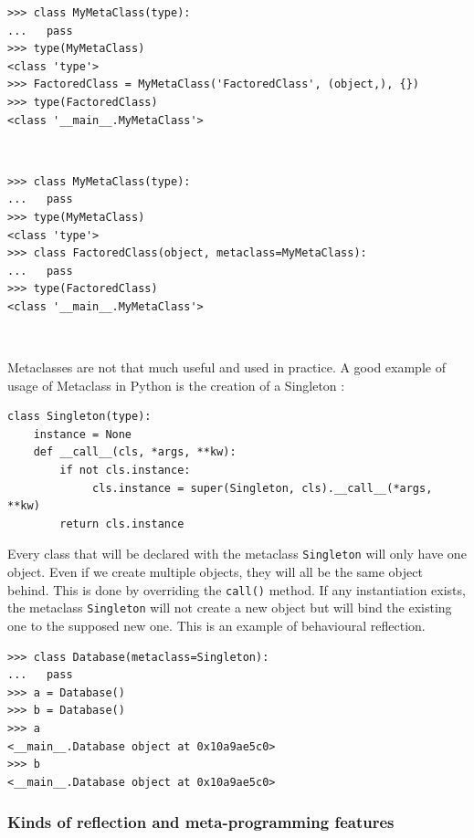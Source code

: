 \documentclass[a4paper,10pt]{article}
\begin{document}
\begin{minipage}[c]{.5\linewidth}
\begin{lstlisting}[caption=Without syntactic sugar]
>>> class MyMetaClass(type):
...   pass
>>> type(MyMetaClass)
<class 'type'>
>>> FactoredClass = MyMetaClass('FactoredClass', (object,), {})
>>> type(FactoredClass)
<class '__main__.MyMetaClass'>
\end{lstlisting}
~\\
\end{minipage} \hfill
\begin{minipage}[c]{.5\linewidth}
\begin{lstlisting}[caption=With syntactic sugar]
>>> class MyMetaClass(type):
...   pass
>>> type(MyMetaClass)
<class 'type'>
>>> class FactoredClass(object, metaclass=MyMetaClass):
...   pass
>>> type(FactoredClass)
<class '__main__.MyMetaClass'>
\end{lstlisting}
~\\
\end{minipage}

Metaclasses are not that much useful and used in practice.
A good example of usage of Metaclass in Python is the creation of a Singleton :

\begin{lstlisting}
class Singleton(type):
    instance = None
    def __call__(cls, *args, **kw):
        if not cls.instance:
             cls.instance = super(Singleton, cls).__call__(*args, **kw)
        return cls.instance
\end{lstlisting}

Every class that will be declared with the metaclass \lstinline|Singleton| will only have one object.
Even if we create multiple objects, they will all be the same object behind.
This is done by overriding the \lstinline|call()| method.
If any instantiation exists, the metaclass \lstinline|Singleton| will not create a new object but will bind the existing one to the supposed new one. This is an example of behavioural reflection.

\begin{lstlisting}
>>> class Database(metaclass=Singleton):
...   pass
>>> a = Database()
>>> b = Database()
>>> a
<__main__.Database object at 0x10a9ae5c0>
>>> b
<__main__.Database object at 0x10a9ae5c0>
\end{lstlisting}


\subsubsection{Kinds of reflection and meta-programming features}
\end{document}
